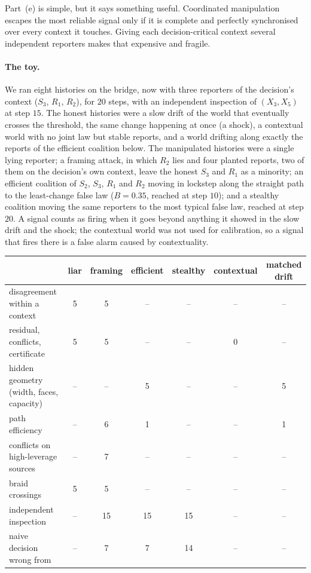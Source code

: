 \documentclass[11pt]{article}
\theoremstyle{definition}\newtheorem{definition}[theorem]{Definition}\newtheorem{remark}[theorem]{Remark}\newtheorem{example}[theorem]{Example}\newtheorem{problem}[theorem]{Open problem}\crefname{problem}{Problem}{Problems}
\begin{document}
Part~(e) is simple, but it says something useful. Coordinated manipulation escapes the most reliable signal only if it is complete and perfectly synchronised over every context it touches. Giving each decision-critical context several independent reporters makes that expensive and fragile.

\paragraph{The toy.} We ran eight histories on the bridge, now with three reporters of the decision's context ($S_3$, $R_1$, $R_2$), for $20$ steps, with an independent inspection of $(X_3,X_5)$ at step $15$. The honest histories were a slow drift of the world that eventually crosses the threshold, the same change happening at once (a shock), a contextual world with no joint law but stable reports, and a world drifting along exactly the reports of the efficient coalition below. The manipulated histories were a single lying reporter; a framing attack, in which $R_2$ lies and four planted reports, two of them on the decision's own context, leave the honest $S_3$ and $R_1$ as a minority; an efficient coalition of $S_2$, $S_3$, $R_1$ and $R_2$ moving in lockstep along the straight path to the least-change false law ($B=0.35$, reached at step $10$); and a stealthy coalition moving the same reporters to the most typical false law, reached at step $20$. A signal counts as firing when it goes beyond anything it showed in the slow drift and the shock; the contextual world was not used for calibration, so a signal that fires there is a false alarm caused by contextuality.

\begin{center}\small
\begin{tabular}{lcccccc}
\toprule
 & liar & framing & efficient & stealthy & contextual & matched drift\\\midrule
disagreement within a context & 5 & 5 & -- & -- & -- & --\\
residual, conflicts, certificate & 5 & 5 & -- & -- & 0 & --\\
hidden geometry (width, faces, capacity) & -- & -- & 5 & -- & -- & 5\\
path efficiency & -- & 6 & 1 & -- & -- & 1\\
conflicts on high-leverage sources & -- & 7 & -- & -- & -- & --\\
braid crossings & 5 & 5 & -- & -- & -- & --\\
independent inspection & -- & 15 & 15 & 15 & -- & --\\\midrule
naive decision wrong from & -- & 7 & 7 & 14 & -- & --\\
\bottomrule
\end{tabular}
\end{center}
\end{document}

